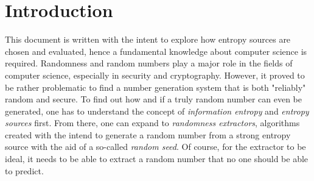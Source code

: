 \section{Introduction}
This document is written with the intent to explore how entropy sources are chosen and evaluated, hence a fundamental knowledge about computer science is required.
\newline
\newline
Randomness and random numbers play a major role in the fields of computer science, especially in security and cryptography. However, it proved to be rather problematic to find a number generation system that is both "reliably" random and secure. To find out how and if a truly random number can even be generated, one has to understand the concept of \emph{information entropy} and \emph{entropy sources} first.
\newline
From there, one can expand to \emph{randomness extractors}, algorithms created with the intend to generate a random number from a strong entropy source with the aid of a so-called \emph{random seed}. Of course, for the extractor to be ideal, it needs to be able to extract a random number that no one should be able to predict.